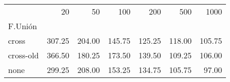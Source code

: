 \begin{tabular}{lrrrrrr}
\toprule
{} &    20   &    50   &    100  &    200  &    500  &    1000 \\
F.Unión   &         &         &         &         &         &         \\
\midrule
cross     &  307.25 &  204.00 &  145.75 &  125.25 &  118.00 &  105.75 \\
cross-old &  366.50 &  180.25 &  173.50 &  139.50 &  109.25 &  106.00 \\
none      &  299.25 &  208.00 &  153.25 &  134.75 &  105.75 &   97.00 \\
\bottomrule
\end{tabular}
